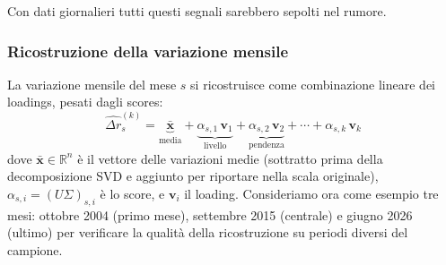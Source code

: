 \documentclass[11pt,a4paper]{article}
\theoremstyle{plain}
\theoremstyle{definition}
\theoremstyle{remark}
\begin{document}
Con dati giornalieri tutti questi segnali sarebbero sepolti nel rumore.




\subsubsection{Ricostruzione della variazione mensile}
\label{sec:ricostruzione}

La variazione mensile del mese $s$ si ricostruisce come combinazione lineare
dei loadings, pesati dagli scores:
\begin{equation}
  \hat{\Delta r}^{(k)}_s
  = \underbrace{\bar{\mathbf{x}}}_{\text{media}}
  + \underbrace{\alpha_{s,1}\,\mathbf{v}_1}_{\text{livello}}
  + \underbrace{\alpha_{s,2}\,\mathbf{v}_2}_{\text{pendenza}}
  + \cdots
  + \alpha_{s,k}\,\mathbf{v}_k
  \label{eq:ricostruzione}
\end{equation}
dove $\bar{\mathbf{x}} \in \mathbb{R}^n$ è il vettore delle variazioni medie
(sottratto prima della decomposizione SVD e aggiunto per riportare nella scala originale),
$\alpha_{s,i} = (U\Sigma)_{s,i}$ è lo score, e $\mathbf{v}_i$ il loading.
\newline
Consideriamo ora come esempio tre mesi: ottobre 2004 (primo mese), settembre 2015 (centrale) e
giugno 2026 (ultimo) per verificare la qualità della ricostruzione
su periodi diversi del campione.
\end{document}
